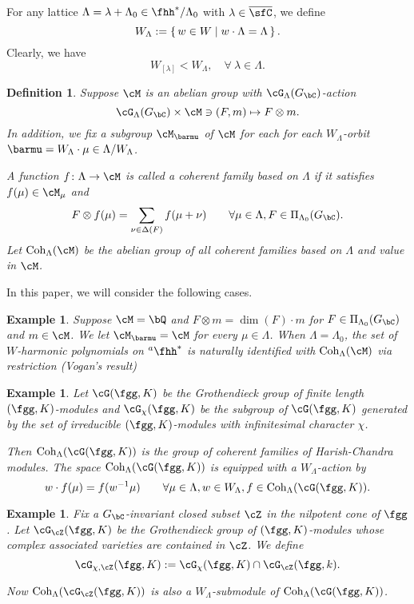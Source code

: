 \documentclass[12pt,a4paper]{amsart}
\numberwithin{equation}{section}
\newtheorem{defn}[thm]{Definition}
\newtheorem{eg}[thm]{Example}
\theoremstyle{remark}
\def\Gc{G_\bC}
\def\hha{{}^a\fhh}
\def\PiGlfin{\Pi_{\Lambda_0}( \Gc )}
\def\WT#1{\Delta(#1)}
\def\WLam{W_{\Lambda}}
\def\Glfin{\cG_{\Lambda}(\Gc)}
\def\bCon{\overline{\sfC}}
\def\Coh{\mathrm{Coh}}
\def\Cohlm{\Coh_{\Lambda}(\cM)}
\begin{document}
For any  lattice  $\Lambda = \lambda + \Lambda_0 \in \fhh^*/\Lambda_{0}$ with $\lambda \in \bCon$,
we define
\[
  W_{\Lambda} := \set{w\in W | w\cdot \Lambda  = \Lambda}.
\]
Clearly, we have
\[
  W_{[\lambda]} < W_{\Lambda}, \quad \forall \ \lambda \in \Lambda.
\]



\begin{defn}
Suppose $\cM$ is an abelian group with $\Glfin$-action
\[
  \Glfin\times \cM \ni(F,m)\mapsto F\otimes m.
\]
In addition,  we fix a subgroup $\cM_{\barmu}$ of $\cM$ for each
 for each $W_{\Lambda}$-orbit $\barmu = W_{\Lambda} \cdot \mu\in \Lambda/W_{\Lambda}$.

A function $f\colon \Lambda \rightarrow \cM$ is called
  a coherent family based on $\Lambda$ if it satisfies
  $f(\mu)\in \cM_\mu$ and
  \[
  F\otimes f(\mu)  = \sum_{\nu \in \WT{F}} f(\mu+\nu) \qquad \forall \mu\in \Lambda, F\in \PiGlfin.
  \]
Let $\Cohlm$ be the abelian group of all coherent families based on $\Lambda$ and value in $\cM$.
\end{defn}

\def\Grt{\cG}

In this paper, we will consider the following cases.

\begin{eg}
Suppose $\cM = \bQ$ and $F\otimes m = \dim(F)\cdot m$ for $F\in \PiGlfin$ and $m\in \cM$.
We let $\cM_{\barmu} = \cM$ for every $\mu\in \Lambda$.
When $\Lambda = \Lambda_0$, the set of $W$-harmonic polynomials on $\hha^*$ is naturally
identified with $\Cohlm$ via restriction (Vogan's result)

\end{eg}

\begin{eg}
Let $\Grt(\fgg,K)$ be the Grothendieck group of finite length $(\fgg,K)$-modules
and $\Grt_{\chi}(\fgg,K)$ be the subgroup of $\Grt(\fgg,K)$ generated by the
set of irreducible $(\fgg,K)$-modules with infinitesimal character $\chi$.

Then $\Coh_\Lambda(\cG(\fgg,K))$ is the group of coherent families of Harish-Chandra modules.
The space $\Coh_\Lambda(\cG(\fgg,K))$ is equipped with a $\WLam$-action by
  \[
    w\cdot f(\mu) =  f(w^{-1} \mu) \qquad \forall \mu\in \Lambda, w\in \WLam,
    f \in \Coh_{\Lambda}(\Grt(\fgg,K)).
  \]
\end{eg}

\begin{eg}
  Fix a $\Gc$-invariant closed subset $\cZ$ in the nilpotent cone of $\fgg$. Let
  $\Grt_{\cZ}(\fgg,K)$ be the Grothendieck group of $(\fgg,K)$-modules
  whose complex associated varieties are contained in $\cZ$.
  We define
  \[
    \Grt_{\chi,\cZ}(\fgg,K) := \Grt_{\chi}(\fgg,K)\cap \Grt_{\cZ}(\fgg,k).
  \]

  Now $\Coh_{\Lambda}(\Grt_{\cZ}(\fgg,K))$ is also a $\WLam$-submodule of
  $\Coh_\Lambda(\cG(\fgg,K))$.
\end{eg}
\end{document}
